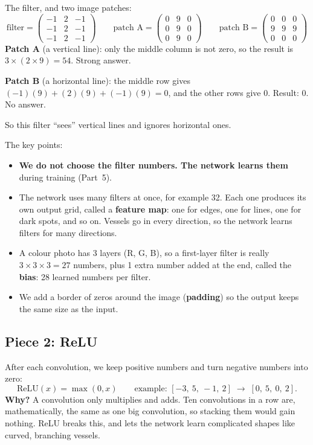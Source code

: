 \documentclass[11pt,a4paper]{article}
\begin{document}
\begin{example}
The filter, and two image patches:
\[
\text{filter} = \begin{pmatrix} -1 & 2 & -1\\ -1 & 2 & -1\\ -1 & 2 & -1 \end{pmatrix}
\qquad
\text{patch A} = \begin{pmatrix} 0 & 9 & 0\\ 0 & 9 & 0\\ 0 & 9 & 0 \end{pmatrix}
\qquad
\text{patch B} = \begin{pmatrix} 0 & 0 & 0\\ 9 & 9 & 9\\ 0 & 0 & 0 \end{pmatrix}
\]
\textbf{Patch A} (a vertical line): only the middle column is not zero, so the result is $3 \times (2\times9) = 54$. Strong answer.

\textbf{Patch B} (a horizontal line): the middle row gives $(-1)(9) + (2)(9) + (-1)(9) = 0$, and the other rows give 0. Result: $0$. No answer.

So this filter ``sees'' vertical lines and ignores horizontal ones.
\end{example}

The key points:
\begin{itemize}
  \item \textbf{We do not choose the filter numbers. The network learns them} during training (Part~5).
  \item The network uses many filters at once, for example 32. Each one produces its own output grid, called a \textbf{feature map}: one for edges, one for lines, one for dark spots, and so on. Vessels go in every direction, so the network learns filters for many directions.
  \item A colour photo has 3 layers (R, G, B), so a first-layer filter is really $3\times3\times3 = 27$ numbers, plus 1 extra number added at the end, called the \textbf{bias}: 28 learned numbers per filter.
  \item We add a border of zeros around the image (\textbf{padding}) so the output keeps the same size as the input.
\end{itemize}

\subsection{Piece 2: ReLU}
After each convolution, we keep positive numbers and turn negative numbers into zero:
\[
\text{ReLU}(x) = \max(0, x) \qquad\text{example: } [-3,\ 5,\ -1,\ 2] \;\to\; [0,\ 5,\ 0,\ 2].
\]
\textbf{Why?} A convolution only multiplies and adds. Ten convolutions in a row are, mathematically, the same as one big convolution, so stacking them would gain nothing. ReLU breaks this, and lets the network learn complicated shapes like curved, branching vessels.
\end{document}
